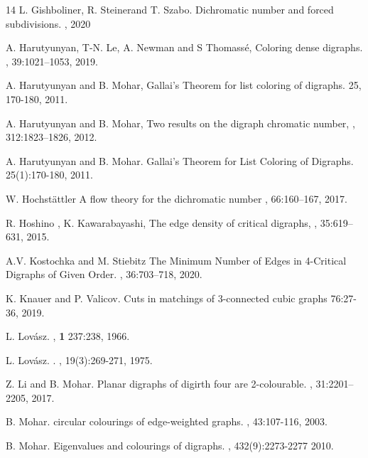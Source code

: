 \documentclass[11pt]{article}
\begin{document}
\begin{thebibliography}{14}
L. Gishboliner, R. Steinerand T. Szabo.
\newblock Dichromatic number and forced subdivisions.
, 2020

A. Harutyunyan, T-N. Le, A. Newman and S Thomass\'e, 
\newblock Coloring dense digraphs.
, 39:1021--1053, 2019.

A. Harutyunyan and B. Mohar, 
\newblock Gallai's Theorem for list coloring of digraphs. 
 25, 170-180, 2011.


A. Harutyunyan and B. Mohar, Two  results  on  the  digraph  chromatic  number, 
, 312:1823–1826, 2012.

A. Harutyunyan and B. Mohar. 
\newblock Gallai's Theorem for List Coloring of Digraphs.
 25(1):170-180, 2011.

W. Hochst\"attler
\newblock A flow theory for the dichromatic number
, 66:160--167, 2017. 


 R. Hoshino , K. Kawarabayashi, The edge density of critical digraphs,
, 35:619--631, 2015.



A.V. Kostochka and M. Stiebitz 
\newblock The Minimum Number of Edges in 4-Critical Digraphs of Given Order. 
, 36:703--718, 2020. 

K. Knauer and P. Valicov.
Cuts in matchings of 3-connected cubic graphs
 76:27-36, 2019. 

L. Lov\'asz. 
, \textbf{1} 237:238, 1966.

L. Lov\'asz. 
. 
, 19(3):269-271, 1975.


 Z. Li and B. Mohar. Planar digraphs of digirth four are 2-colourable.
, 31:2201--2205, 2017.

B. Mohar. 
\newblock circular colourings of edge-weighted graphs. 
, 43:107-116, 2003.

B. Mohar.
\newblock Eigenvalues and colourings of digraphs.
, 432(9):2273-2277 2010.



\end{thebibliography}
\end{document}
